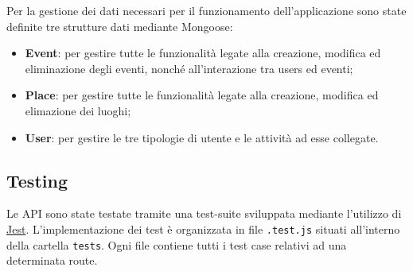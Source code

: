 \documentclass[9pt]{extarticle}
\begin{document}
Per la gestione dei dati necessari per il funzionamento dell'applicazione sono state definite tre strutture dati mediante Mongoose:
\begin{itemize}
	\item \textbf{Event}: per gestire tutte le funzionalità legate alla creazione, modifica ed eliminazione degli eventi, nonché all'interazione tra users ed eventi;
	\item \textbf{Place}: per gestire tutte le funzionalità legate alla creazione, modifica ed elimazione dei luoghi;
	\item \textbf{User}: per gestire le tre tipologie di utente e le attività ad esse collegate.
\end{itemize}

\newpage
\subsection{Testing}

Le API sono state testate tramite una test-suite sviluppata mediante l'utilizzo di \href{https://jestjs.io/}{Jest}. L’implementazione dei test è organizzata in file \verb|.test.js| situati all'interno della cartella \verb*|tests|. Ogni file contiene tutti i test case relativi ad una determinata route.
\end{document}
